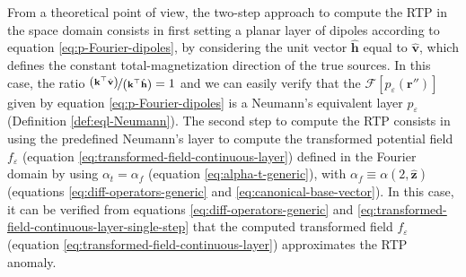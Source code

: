 From a theoretical point of view, the two-step approach to compute the RTP in the space domain 
consists in first setting a planar layer of dipoles according to equation \ref{eq:p-Fourier-dipoles}, 
by considering the unit vector $\hat{\mathbf{h}}$ equal to $\hat{\mathbf{v}}$, which defines 
the constant total-magnetization direction of the true sources.
In this case, the ratio $\nicefrac{\left(\mathbf{k}^{\top} \hat{\mathbf{v}} \right)}{\left(\mathbf{k}^{\top} \hat{\mathbf{h}} \right)} = 1$ 
and we can easily verify that the $\mathcal{F} [ p_{\varepsilon}(\mathbf{r}'') ]$ given by 
equation \ref{eq:p-Fourier-dipoles} is a Neumann's equivalent layer $p_{\varepsilon}$ (Definition \ref{def:eql-Neumann}).
The second step to compute the RTP consists in using the predefined Neumann's layer to compute 
the transformed potential field $f_{\varepsilon}$ (equation \ref{eq:transformed-field-continuous-layer}) defined in the Fourier domain 
by using $\alpha_{t} = \alpha_{f}$ (equation \ref{eq:alpha-t-generic}), with 
$\alpha_{f} \equiv \alpha(2, \hat{\mathbf{z}})$ (equations \ref{eq:diff-operators-generic} and \ref{eq:canonical-base-vector}).
In this case, it can be verified from equations \ref{eq:diff-operators-generic} and \ref{eq:transformed-field-continuous-layer-single-step} 
that the computed transformed field $f_{\varepsilon}$ (equation \ref{eq:transformed-field-continuous-layer}) 
approximates the RTP anomaly.

